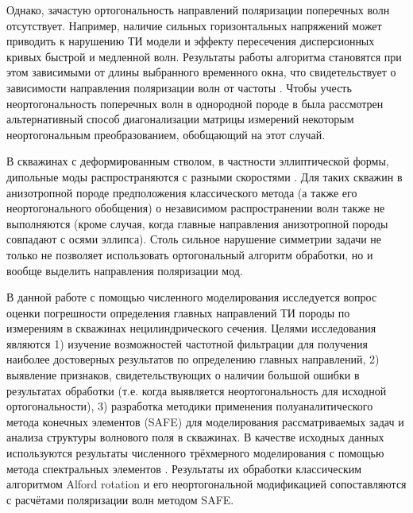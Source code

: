 \documentclass[a4paper,11pt]{article}
\begin{document}
Однако, зачастую ортогональность направлений поляризации поперечных волн отсутствует. Например, наличие сильных горизонтальных напряжений может приводить к нарушению ТИ модели и эффекту пересечения дисперсионных кривых быстрой и медленной волн. Результаты работы алгоритма становятся при этом зависимыми от длины выбранного временного окна, что свидетельствует о зависимости направления поляризации волн от частоты \cite{Nolte1997}. Чтобы учесть неортогональность поперечных волн в однородной породе в \cite{Dellinger1998} была рассмотрен альтернативный способ диагонализации матрицы измерений некоторым неортогональным преобразованием, обобщающий \cite{Alford1986} на этот случай. %

В скважинах с деформированным стволом, в частности эллиптической формы, дипольные моды распространяются с разными скоростями \cite{Seroices2010}. Для таких скважин в анизотропной породе предположения классического метода (а также его неортогонального обобщения) о независимом распространении волн также не выполняются (кроме случая, когда главные направления анизотропной породы совпадают с осями эллипса). Столь сильное нарушение симметрии задачи не только не позволяет использовать ортогональный алгоритм обработки, но и вообще выделить направления поляризации мод. 

В данной работе с помощью численного моделирования исследуется вопрос оценки погрешности определения главных направлений ТИ породы по измерениям в скважинах нецилиндрического сечения. Целями исследования являются 1) изучение возможностей частотной фильтрации для получения наиболее достоверных результатов по определению главных направлений, 2) выявление признаков, свидетельствующих о наличии большой ошибки в результатах обработки (т.е. когда выявляется неортогональность для исходной ортогональности), 3) разработка методики применения полуаналитического метода конечных элементов (SAFE) \cite{Bartoli2006} для моделирования рассматриваемых задач и анализа структуры волнового поля в скважинах. В качестве исходных данных используются результаты численного трёхмерного моделирования с помощью метода спектральных элементов \cite{Komatitsch2000}. Результаты их обработки классическим алгоритмом Alford rotation \cite{Alford1986} и его неортогональной модификацией \cite{Dellinger1998} сопоставляются с расчётами поляризации волн методом SAFE. %
\end{document}
